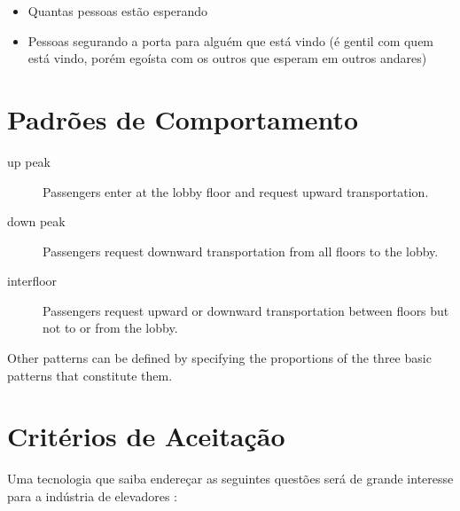 \begin{itemize}
\item Quantas pessoas estão esperando
\item Pessoas segurando a porta para alguém que está vindo (é gentil com quem está vindo, porém egoísta com os outros que esperam em outros andares)
\end{itemize}

\section{Padrões de Comportamento}

\begin{description}
\item[up peak] Passengers enter at the lobby floor and request upward transportation.
\item[down peak] Passengers request downward transportation from all floors to the lobby.
\item[interfloor] Passengers request upward or downward transportation between floors but not to or from the lobby.
\end{description}

Other patterns can be defined by specifying the proportions of the three basic patterns that constitute them.

\section{Critérios de Aceitação}

Uma tecnologia que saiba endereçar as seguintes questões será de grande interesse para a indústria de elevadores \cite{KOEHLEROTTIGER02}:

